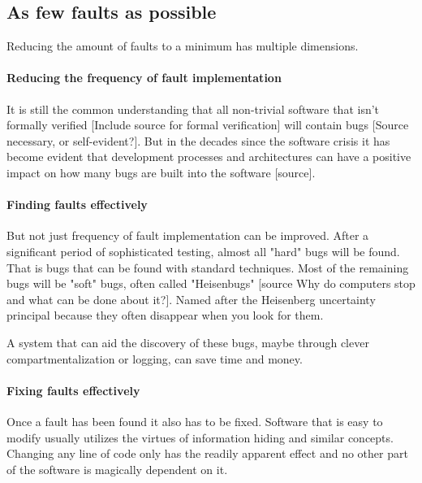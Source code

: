 \subsection{As few faults as possible}
Reducing the amount of faults to a minimum has multiple dimensions. 
\paragraph{Reducing the frequency of fault implementation}
It is still the common understanding that all non-trivial software that isn't formally verified [Include source for formal verification] will contain bugs [Source necessary, or self-evident?]. But in the decades since the software crisis it has become evident that development processes and architectures can have a positive impact on how many bugs are built into the software [source].  
\paragraph{Finding faults effectively}
But not just frequency of fault implementation can be improved. After a significant period of sophisticated testing, almost all "hard" bugs will be found. That is bugs that can be found with standard techniques. Most of the remaining bugs will be "soft" bugs, often called "Heisenbugs" [source Why do computers stop and what can be done about it?]. Named after the Heisenberg uncertainty principal because they often disappear when you look for them. 

A system that can aid the discovery of these bugs, maybe through clever compartmentalization or logging, can save time and money.
\paragraph{Fixing faults effectively}
Once a fault has been found it also has to be fixed. Software that is easy to modify usually utilizes the virtues of information hiding and similar  concepts. Changing any line of code only has the readily apparent effect and no other part of the software is magically dependent on it.


